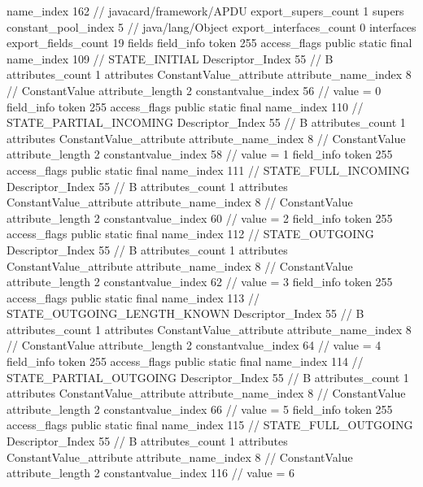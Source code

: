 {{{			name_index	162		// javacard/framework/APDU
			export_supers_count	1
			supers {
				constant_pool_index	5		// java/lang/Object
			}
			export_interfaces_count	0
			interfaces {
			}
			export_fields_count	19
			fields {
			field_info {
				token	255
				access_flags	public static final
				name_index	109		// STATE_INITIAL
				Descriptor_Index	55		// B
				attributes_count	1
				attributes {
				ConstantValue_attribute {
					attribute_name_index	8		// ConstantValue
					attribute_length	2
					constantvalue_index	56		// value = 0
				}
				}
			}
			field_info {
				token	255
				access_flags	public static final
				name_index	110		// STATE_PARTIAL_INCOMING
				Descriptor_Index	55		// B
				attributes_count	1
				attributes {
				ConstantValue_attribute {
					attribute_name_index	8		// ConstantValue
					attribute_length	2
					constantvalue_index	58		// value = 1
				}
				}
			}
			field_info {
				token	255
				access_flags	public static final
				name_index	111		// STATE_FULL_INCOMING
				Descriptor_Index	55		// B
				attributes_count	1
				attributes {
				ConstantValue_attribute {
					attribute_name_index	8		// ConstantValue
					attribute_length	2
					constantvalue_index	60		// value = 2
				}
				}
			}
			field_info {
				token	255
				access_flags	public static final
				name_index	112		// STATE_OUTGOING
				Descriptor_Index	55		// B
				attributes_count	1
				attributes {
				ConstantValue_attribute {
					attribute_name_index	8		// ConstantValue
					attribute_length	2
					constantvalue_index	62		// value = 3
				}
				}
			}
			field_info {
				token	255
				access_flags	public static final
				name_index	113		// STATE_OUTGOING_LENGTH_KNOWN
				Descriptor_Index	55		// B
				attributes_count	1
				attributes {
				ConstantValue_attribute {
					attribute_name_index	8		// ConstantValue
					attribute_length	2
					constantvalue_index	64		// value = 4
				}
				}
			}
			field_info {
				token	255
				access_flags	public static final
				name_index	114		// STATE_PARTIAL_OUTGOING
				Descriptor_Index	55		// B
				attributes_count	1
				attributes {
				ConstantValue_attribute {
					attribute_name_index	8		// ConstantValue
					attribute_length	2
					constantvalue_index	66		// value = 5
				}
				}
			}
			field_info {
				token	255
				access_flags	public static final
				name_index	115		// STATE_FULL_OUTGOING
				Descriptor_Index	55		// B
				attributes_count	1
				attributes {
				ConstantValue_attribute {
					attribute_name_index	8		// ConstantValue
					attribute_length	2
					constantvalue_index	116		// value = 6
				}
				}
			}
}}}}
